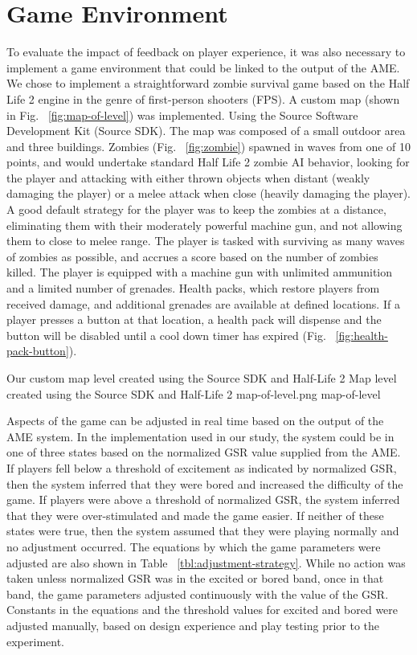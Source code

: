 \section{Game Environment}
To evaluate the impact of feedback on player experience, it was also necessary to implement a game environment that could be linked to the output of the AME. We chose to implement a straightforward zombie survival game based on the Half Life 2 engine in the genre of first-person shooters (FPS). A custom map (shown in Fig. ~\ref{fig:map-of-level}) was implemented. Using the Source Software Development Kit (Source SDK). The map was composed of a small outdoor area and three buildings. Zombies (Fig. ~\ref{fig:zombie}) spawned in waves from one of 10 points, and would undertake standard Half Life 2 zombie AI behavior, looking for the player and attacking with either thrown objects when distant (weakly damaging the player) or a melee attack when close (heavily damaging the player). A good default strategy for the player was to keep the zombies at a distance, eliminating them with their moderately powerful machine gun, and not allowing them to close to melee range. The player is tasked with surviving as many waves of zombies as possible, and accrues a score based on the number of zombies killed. The player is equipped with a machine gun with unlimited ammunition and a limited number of grenades. Health packs, which restore players from received damage, and additional grenades are available at defined locations. If a player presses a button at that location, a health pack will dispense and the button will be disabled until a cool down timer has expired (Fig. ~\ref{fig:health-pack-button}).

\largeimg
{Our custom map level created using the Source SDK and Half-Life 2}
{Map level created using the Source SDK and Half-Life 2}
{map-of-level.png}
{map-of-level}

Aspects of the game can be adjusted in real time based on the output of the AME system. In the implementation used in our study, the system could be in one of three states based on the normalized GSR value supplied from the AME. If players fell below a threshold of excitement as indicated by normalized GSR, then the system inferred that they were bored and increased the difficulty of the game. If players were above a threshold of normalized GSR, the system inferred that they were over-stimulated and made the game easier. If neither of these states were true, then the system assumed that they were playing normally and no adjustment occurred. The equations by which the game parameters were adjusted are also shown in Table ~\ref{tbl:adjustment-strategy}. While no action was taken unless normalized GSR was in the excited or bored band, once in that band, the game parameters adjusted continuously with the value of the GSR. Constants in the equations and the threshold values for excited and bored were adjusted manually, based on design experience and play testing prior to the experiment.

